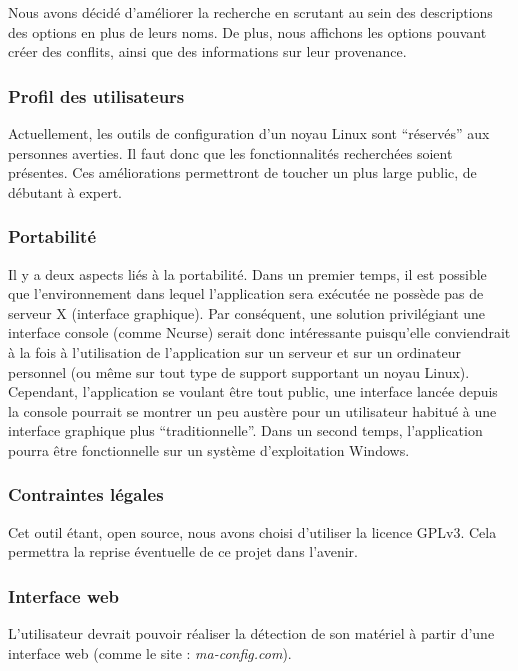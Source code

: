 \documentclass[17pts]{report}
\begin{document}
Nous avons décidé d’améliorer la recherche en scrutant au sein des descriptions
des options en plus de leurs noms. De plus, nous affichons les options pouvant
créer des conflits, ainsi que des informations sur leur provenance.

\subsubsection{Profil des utilisateurs}
\label{ssub:Profil des utilisateurs}
Actuellement, les outils de configuration d’un noyau Linux sont “réservés” aux
personnes averties. Il faut donc que les fonctionnalités recherchées soient
présentes. Ces améliorations permettront de toucher un plus large public, de
débutant à expert.

\subsubsection{Portabilité}
\label{ssub:Portabilité}
Il y a deux aspects liés à la portabilité. Dans un premier temps, il est
possible que l’environnement dans lequel l’application sera exécutée ne possède
pas de serveur X (interface graphique). Par conséquent, une solution
privilégiant une interface console (comme Ncurse) serait donc intéressante
puisqu’elle conviendrait à la fois à l’utilisation de l’application sur un
serveur et sur un ordinateur personnel (ou même sur tout type de support
supportant un noyau Linux). Cependant, l’application se voulant être tout
public, une interface lancée depuis la console pourrait se montrer un peu
austère pour un utilisateur habitué à une interface graphique plus
“traditionnelle”.  Dans un second temps, l’application pourra être
fonctionnelle sur un système d’exploitation Windows.

\subsubsection{Contraintes légales}
\label{ssub:Contraintes légales}
Cet outil étant, open source, nous avons choisi d’utiliser la licence GPLv3.
Cela permettra la reprise éventuelle de ce projet dans l’avenir.

\subsubsection{Interface web}
\label{ssub:Interface web}
L’utilisateur devrait pouvoir réaliser la détection de son matériel à partir
d’une interface web (comme le site : \textit{ma-config.com}).
\end{document}
